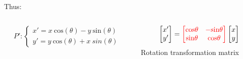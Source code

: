\documentclass[9pt, aspectratio=169]{beamer}
\begin{document}
\begin{frame}
    \normalsize
    \pause
    Thus:
    \begin{columns}
        \begin{column}{0.5\textwidth}
            $$P': \begin{cases}x' = x~\text{cos}(\theta)-y~\text{sin}(\theta)\\y' = y~\text{cos}(\theta)+x~{sin}(\theta)\end{cases}$$
        \end{column}
        \pause
        \begin{column}{0.5\textwidth}
            $$\begin{bmatrix}x'\\y'\end{bmatrix} = \color{red}\begin{bmatrix}\text{cos}\theta&-\text{sin}\theta\\\text{sin}\theta&\text{cos}\theta\end{bmatrix}\color{black}\begin{bmatrix}x\\y\end{bmatrix}$$
            \centering
            \color{red}Rotation transformation matrix
        \end{column}
    \end{columns}
\end{frame}
\end{document}
